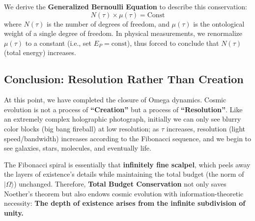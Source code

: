 We derive the \textbf{Generalized Bernoulli Equation} to describe this conservation:
\[N(\tau) \times \mu(\tau) = \text{Const}\]
where $N(\tau)$ is the number of degrees of freedom, and $\mu(\tau)$ is the ontological weight of a single degree of freedom. In physical measurements, we renormalize $\mu(\tau)$ to a constant (i.e., set $E_P = \text{const}$), thus forced to conclude that $N(\tau)$ (total energy) increases.

\subsection{Conclusion: Resolution Rather Than Creation}

At this point, we have completed the closure of Omega dynamics.
Cosmic evolution is not a process of \textbf{``Creation''} but a process of \textbf{``Resolution''}.
Like an extremely complex holographic photograph, initially we can only see blurry color blocks (big bang fireball) at low resolution; as $\tau$ increases, resolution (light speed/bandwidth) increases according to the Fibonacci sequence, and we begin to see galaxies, stars, molecules, and eventually life.

The Fibonacci spiral is essentially that \textbf{infinitely fine scalpel}, which peels away the layers of existence's details while maintaining the total budget (the norm of $|\Omega\rangle$) unchanged.
Therefore, \textbf{Total Budget Conservation} not only saves Noether's theorem but also endows cosmic evolution with information-theoretic necessity: \textbf{The depth of existence arises from the infinite subdivision of unity.}
